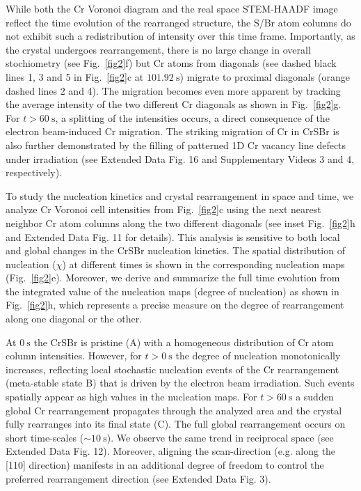 \documentclass[aps,prl,showpacs,twocolumn,superscriptaddress,floatfix]{revtex4-2}
\begin{document}
While both the Cr Voronoi diagram and the real space STEM-HAADF image reflect the time evolution of the rearranged structure, the S/Br atom columns do not exhibit such a redistribution of intensity over this time frame. Importantly, as the crystal undergoes rearrangement, there is no large change in overall stochiometry (see Fig.~\ref{fig2}f) but Cr atoms from diagonals (see dashed black lines 1, 3 and 5 in Fig.~\ref{fig2}c at $\SI{101.92}{\second}$) migrate to proximal diagonals (orange dashed lines 2 and 4). The migration becomes even more apparent by tracking the average intensity of the two different Cr diagonals as shown in Fig.~\ref{fig2}g. For $t > \SI{60}{\second}$, a splitting of the intensities occurs, a direct consequence of the electron beam-induced Cr migration. The striking migration of Cr in CrSBr is also further demonstrated by the filling of patterned 1D Cr vacancy line defects under irradiation (see Extended Data Fig. 16 and Supplementary Videos 3 and 4, respectively).

To study the nucleation kinetics and crystal rearrangement in space and time, we analyze Cr Voronoi cell intensities from Fig.~\ref{fig2}c using the next nearest neighbor Cr atom columns along the two different diagonals (see inset Fig.~\ref{fig2}h and Extended Data Fig. 11 for details). This analysis is sensitive to both local and global changes in the CrSBr nucleation kinetics. The spatial distribution of nucleation ($\chi$) at different times is shown in the corresponding nucleation maps (Fig.~\ref{fig2}e). Moreover, we derive and summarize the full time evolution from the integrated value of the nucleation maps (degree of nucleation) as shown in Fig.~\ref{fig2}h, which represents a precise measure on the degree of rearrangement along one diagonal or the other.

At $\SI{0}{\second}$ the CrSBr is pristine (A) with a homogeneous distribution of Cr atom column intensities. However, for $t > \SI{0}{\second}$ the degree of nucleation monotonically increases, reflecting local stochastic nucleation events of the Cr rearrangement (meta-stable state B) that is driven by the electron beam irradiation. Such events spatially appear as high values in the nucleation maps. For $t > \SI{60}{\second}$ a sudden global Cr rearrangement propagates through the analyzed area and the crystal fully rearranges into its final state (C). The full global rearrangement occurs on short time-scales ($\sim \SI{10}{\second}$). We observe the same trend in reciprocal space (see Extended Data Fig. 12). Moreover, aligning the scan-direction (e.g. along the [110] direction) manifests in an additional degree of freedom to control the preferred rearrangement direction (see Extended Data Fig. 3).
\end{document}
